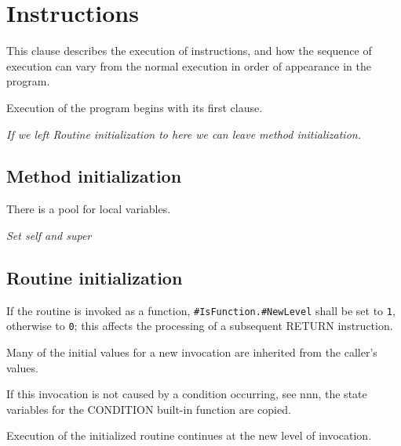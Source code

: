 \chapter{Instructions}\label{instructions}

This clause describes the execution of instructions, and how the
sequence of execution can vary from the normal execution in order of
appearance in the program.

Execution of the program begins with its first clause.

\emph{If we left Routine initialization to here we can leave method
initialization.}

\section{Method initialization}\label{method-initialization}

There is a pool for local variables.



\emph{Set self and super}

\section{Routine initialization}\label{routine-initialization}

If the routine is invoked as a function,
\texttt{\#IsFunction.\#NewLevel} shall be set to
\texttt{\textquotesingle{}1\textquotesingle{}}, otherwise to
\texttt{\textquotesingle{}0\textquotesingle{}}; this affects the
processing of a subsequent RETURN instruction.



Many of the initial values for a new invocation are inherited from the
caller's values.



If this invocation is not caused by a condition occurring, see nnn, the
state variables for the CONDITION built-in function are copied.



Execution of the initialized routine continues at the new level of
invocation.

